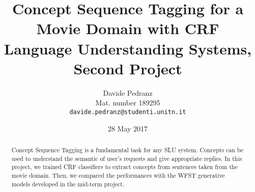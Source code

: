 \documentclass[11pt,a4paper]{article}
\title{
  Concept Sequence Tagging for a Movie Domain with CRF \\
  Language Understanding Systems, Second Project
}
\author{Davide Pedranz \\
  Mat. number 189295 \\
  {\tt davide.pedranz@studenti.unitn.it}
}
\date{28 May 2017}
\begin{document}
\maketitle

\begin{abstract}
Concept Sequence Tagging is a fundamental task for any \ac{SLU} system.
Concepts can be used to understand the semantic of user's requests and give appropriate replies.
In this project, we trained \ac{CRF} classifiers to extract concepts from sentences taken from the movie domain.
Then, we compared the performances with the \ac{WFST} generative models developed in the mid-term project.
\end{abstract}










\end{document}
